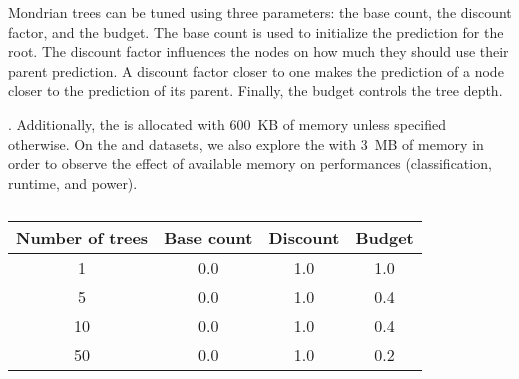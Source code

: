 Mondrian trees can be tuned using three parameters: the base count, the discount
factor, and the budget. The base count is used to initialize the prediction for
the root. The discount factor influences the nodes on how much they should use
their parent prediction. A discount factor closer to one makes the prediction of
a node closer to the prediction of its parent.  Finally, the budget controls the
tree depth.

.  Additionally, the \mondrianforest is allocated with 600~KB of memory
unless specified otherwise.  On the \banosdataset and \recofitdataset datasets,
we also explore the \mondrianforest with 3~MB of memory in order to observe the
effect of available memory on performances (classification, runtime, and power).

\begin{table}
		\begin{center}
		\begin{tabular}{|c|c|c|c|}
		\hline
		Number of trees & Base count & Discount & Budget\\
		\hline
		1               & 0.0        & 1.0      & 1.0 \\
		5               & 0.0        & 1.0      & 0.4 \\
		10              & 0.0        & 1.0      & 0.4 \\
		50              & 0.0        & 1.0      & 0.2 \\
		\hline
		\end{tabular}
		\end{center}
		\caption{}
		\label{tab:mondrian-parameters}
\end{table}

